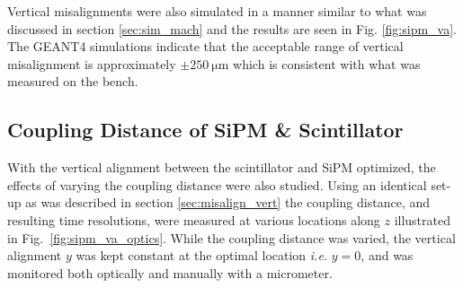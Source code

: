 Vertical misalignments were also simulated in a manner similar to what was discussed in section \ref{sec:sim_mach} and the results are seen in Fig. \ref{fig:sipm_va}.
The GEANT4 simulations indicate that the acceptable range of vertical misalignment is approximately $\pm 250\ \mathrm{\mu m}$ \cite{puneet_sim_talk} which is consistent with what was measured on the bench.

\subsection{Coupling Distance of SiPM \& Scintillator}

With the vertical alignment between the scintillator and SiPM optimized, the effects of varying the coupling distance were also studied.  Using an identical set-up as was described in section \ref{sec:misalign_vert} the coupling distance, and resulting time resolutions, were measured at various locations along $z$ illustrated in Fig.~\ref{fig:sipm_va_optics}.  While the coupling distance was varied, the vertical alignment $y$ was kept constant at the optimal location \textit{i.e.} $y = 0$, and was monitored both optically and manually with a micrometer.

